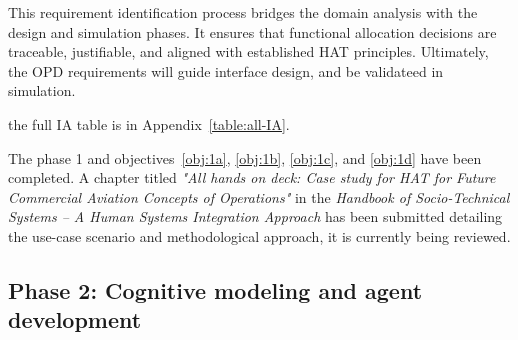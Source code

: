 \documentclass[12pt,a4paper]{article} %
\begin{document}
	This requirement identification process bridges the domain analysis with the design and simulation phases. It ensures that functional allocation decisions are traceable, justifiable, and aligned with established HAT principles. Ultimately, the OPD requirements will guide interface design, and be validateed in simulation.

	the full IA table is in Appendix~\ref{table:all-IA}.

	The phase 1 and objectives~\ref{obj:1a}, \ref{obj:1b}, \ref{obj:1c}, and \ref{obj:1d} have been completed. A chapter titled \textit{"All hands on deck: Case study for HAT for Future Commercial Aviation Concepts of Operations"} in the \textit{Handbook of Socio-Technical Systems -- A Human Systems Integration Approach} has been submitted detailing the use-case scenario and methodological approach, it is currently being reviewed.

	\subsection{Phase 2: Cognitive modeling and agent development}
\end{document}

